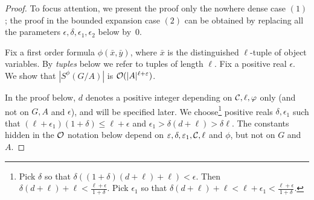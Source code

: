 \begin{proof}
%
	
 To focus attention, we present the proof only the nowhere dense case $(1)$;
 the proof in the bounded expansion case $(2)$ 
 can be obtained by replacing  all the parameters $\epsilon,\delta,\epsilon_1,\epsilon_2$ below by~$0$.
	
  Fix a first order formula $\phi(\bar x,\bar y)$, where $\bar x$ is the distinguished $\ell$-tuple of object variables.
    By \emph{tuples} below we refer to tuples of length $\ell$.
	   Fix a positive real $\epsilon$. 	   We show that $|S^\phi(G/A)|$ is $\Oof(|A|^{\ell+\epsilon})$.

	   \medskip
	   
	   
	   
In the proof below, $d$ denotes a positive integer 
depending on ${\cal C},\ell,\phi$ only (and not on $G, A$ and $\epsilon$), and will be specified later. We choose\footnote{Pick $\delta$ so that	 $\delta((1+\delta)(d+\ell)+\ell)<\epsilon$. Then $\delta(d+\ell)+\ell<\frac{\ell+\epsilon}{1+\delta}$. Pick $\epsilon_1$ so that $\delta(d+\ell)+\ell<\ell+\epsilon_1<\frac{\ell+\epsilon}{1+\delta}$.} positive reals
$\delta,\epsilon_1$  such that 
	 $(\ell+\epsilon_1)(1+\delta) 
	 \le
	 \ell+\epsilon$ and $\epsilon_1>\delta(d+\ell)> \delta\ell$.	 
The constants hidden in the $\Oof$ notation below depend
 on $\epsilon,\delta,\epsilon_1,\cal C, \ell$ and $\phi$, but not on $G$ and $A$.

 


\end{proof}
